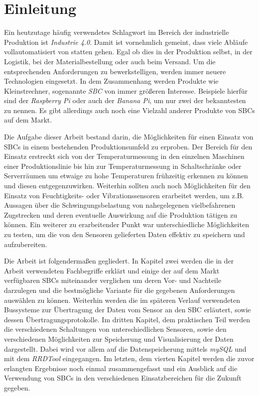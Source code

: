 \chapter{Einleitung}

Ein heutzutage häufig verwendetes Schlagwort im Bereich der industrielle Produktion ist \textit{Industrie 4.0}. Damit ist vornehmlich gemeint, dass viele Abläufe vollautomatisiert von statten gehen. Egal ob dies in der Produktion selbst, in der Logistik, bei der Materialbestellung oder auch beim Versand. Um die entsprechenden Anforderungen zu bewerkstelligen, werden immer neuere Technologien eingesetzt. In dem Zusammenhang werden Produkte wie Kleinstrechner, sogenannte \textit{\ac{SBC}} von immer größeren Interesse. Beispiele hierfür sind der \textit{\glqq Raspberry Pi\grqq} oder auch der \textit{\glqq Banana Pi\grqq}, um nur zwei der bekanntesten zu nennen. Es gibt allerdings auch noch eine Vielzahl anderer Produkte von \acp{SBC} auf dem Markt.

Die Aufgabe dieser Arbeit bestand darin, die Möglichkeiten für einen Einsatz von \acp{SBC} in einem bestehenden Produktionsumfeld zu erproben. Der Bereich für den Einsatz erstreckt sich von der Temperaturmessung in den einzelnen Maschinen einer Produktionslinie bis hin zur Temperaturmessung in Schaltschränke oder Serverräumen um etwaige zu hohe Temperaturen frühzeitig erkennen zu können und diesen entgegenzuwirken. Weiterhin sollten auch noch Möglichkeiten für den Einsatz von Feuchtigkeits- oder Vibrationssensoren erarbeitet werden, um z.B. Aussagen über die Schwingungsbelastung von nahegelegenen vielbefahrenen Zugstrecken und deren eventuelle Auswirkung auf die Produktion tätigen zu können. Ein weiterer zu erarbeitender Punkt war unterschiedliche Möglichkeiten zu testen, um die von den Sensoren gelieferten Daten effektiv zu speichern und aufzubereiten.

Die Arbeit ist folgendermaßen gegliedert. In Kapitel zwei werden die in der Arbeit verwendeten Fachbegriffe erklärt und einige der auf dem Markt verfügbaren \acp{SBC} miteinander verglichen um deren Vor- und Nachteile darzulegen und die bestmögliche Variante für die gegebenen Anforderungen auswählen zu können. Weiterhin werden die im späteren Verlauf verwendeten Bussysteme zur Übertragung der Daten vom Sensor an den \acl{SBC} erläutert, sowie dessen Übertragungsprotokolle. Im dritten Kapitel, dem praktischen Teil werden die verschiedenen Schaltungen von unterschiedlichen Sensoren, sowie den verschiedenen Möglichkeiten zur Speicherung und Visualisierung der Daten dargestellt. Dabei wird vor allem auf die Datenspeicherung mittels \textit{mySQL} und mit dem \textit{RRDTool} eingegangen. Im letzten, dem vierten Kapitel werden die zuvor erlangten Ergebnisse noch einmal zusammengefasst und ein Ausblick auf die Verwendung von \acp{SBC} in den verschiedenen Einsatzbereichen für die Zukunft gegeben.